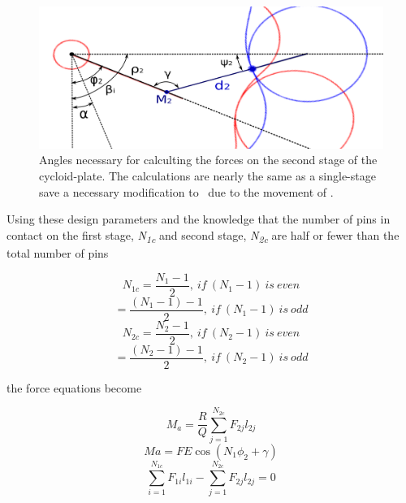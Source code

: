 \begin{figure}[h]
	\centering
	\includegraphics[width=0.8\linewidth]{fig/two_stage_loads_angles_2}
   \caption{Angles necessary for calculting the forces on the second stage of the cycloid-plate. The calculations are nearly the same as a single-stage save a necessary modification to \textbeta\ due to the movement of \textalpha.}
   \label{fig:two_stage_force_beta}
\end{figure}

Using these design parameters and the knowledge that the number of pins in contact on the first stage, \textit{N\textsubscript{1c}} and second stage, \textit{N\textsubscript{2c}} are half or fewer than the total number of pins

\begin{equation}
N_{1c} = \frac{N_{1} - 1}{2},\ if\ (N_1 -1)\ is\ even 
\end{equation}
\begin{equation}
= \frac{(N_{1}-1) - 1}{2},\ if\ (N_{1} - 1)\ is\ odd 
\end{equation}
\begin{equation}
N_{2c} = \frac{N_{2}-1}{2},\ if\ (N_{2}-1)\ is\ even 
\end{equation}
\begin{equation}
= \frac{(N_{2}-1) - 1}{2},\ if\ (N_{2}-1)\ is\ odd 
\end{equation}

the force equations become 

\begin{equation} \label{eq:dual_power}
M_a = \frac{R}{Q} \sum_{j=1}^{N_{2c}} F_{2j} l_{2j}
\end{equation}
\begin{equation} \label{eq:dual_input}
Ma = F E \cos(N_1 \phi_2 + \gamma)
\end{equation}
\begin{equation} \label{eq:dual_torqe}
\sum_{i=1}^{N_{1c}}F_{1i} l_{1i} - \sum_{j=1}^{N_{2c}}F_{2j} l_{2j} = 0
\end{equation}

